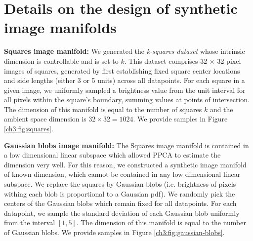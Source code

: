     \section{Details on the design of synthetic image manifolds}\label{ch3:Appendix:_design_of_synthetic_image_manifolds}

    \textbf{Squares image manifold:} We generated the \textit{k-squares dataset} whose intrinsic dimension is controllable and is set to $k$. This dataset comprises 32 × 32 pixel images of squares, generated by first establishing fixed square center locations and side lengths (either 3 or 5 units) across all datapoints. For each square in a given image, we uniformly sampled a brightness value from the unit interval for all pixels within the square's boundary, summing values at points of intersection. The dimension of this manifold is equal to the number of squares $k$ and the ambient space dimension is $32\times32=1024$. We provide samples in Figure \ref{ch3:fig:squares}.
    
    \textbf{Gaussian blobs image manifold:} The Squares image manifold is contained in a low dimensional linear subspace which allowed PPCA to estimate the dimension very well. For this reason, we constructed a synthetic image manifold of known dimension, which cannot be contained in any low dimensional linear subspace.  We replace the squares by Gaussian blobs (i.e. brightness of pixels withing each blob is proportional to a Gaussian pdf). We randomly pick the centers of the Gaussian blobs which remain fixed for all datapoints. For each datapoint, we sample the standard deviation of each Gaussian blob uniformly from the interval $[1,5]$. The dimension of this manifold is equal to the number of Gaussian blobs. We provide samples in Figure \ref{ch3:fig:gaussian-blobs}.

